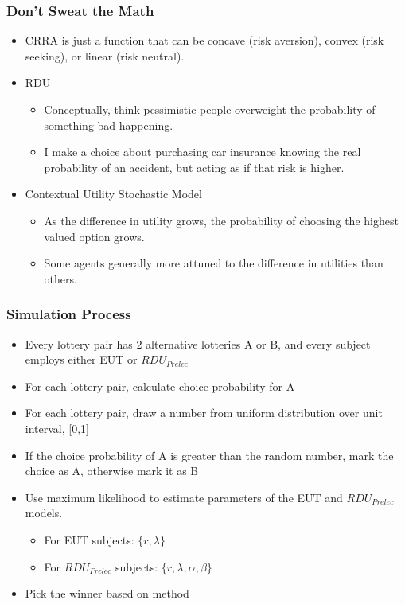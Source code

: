 \documentclass{beamer}
\begin{document}
\begin{frame}
\frametitle{Don't Sweat the Math}
\begin{itemize}
	\item CRRA is just a function that can be concave (risk aversion), convex (risk seeking), or linear (risk neutral).
\end{itemize}
\begin{itemize}
	\item RDU
		\begin{itemize}
			\item Conceptually, think pessimistic people overweight the probability of something bad happening.
			\item I make a choice about purchasing car insurance knowing the real probability of an accident, but acting as if that risk is higher.
		\end{itemize}
\end{itemize}
\begin{itemize}
	\item Contextual Utility Stochastic Model
		\begin{itemize}
			\item As the difference in utility grows, the probability of choosing the highest valued option grows.
			\item Some agents generally more attuned to the difference in utilities than others.
		\end{itemize}
\end{itemize}
\end{frame}

\begin{frame}
\frametitle{Simulation Process}
\begin{itemize}
	\item Every lottery pair has 2 alternative lotteries A or B, and every subject employs either EUT or $\mathit{RDU_{Prelec}}$
	\item For each lottery pair, calculate choice probability for A
	\item For each lottery pair, draw a number from uniform distribution over unit interval, [0,1]
	\item If the choice probability of A is greater than the random number, mark the choice as A, otherwise mark it as B
	\item Use maximum likelihood to estimate parameters of the EUT and $\mathit{RDU_{Prelec}}$ models.
		\begin{itemize}
			\item For EUT subjects: $\lbrace r, \lambda \rbrace$
			\item For $\mathit{RDU_{Prelec}}$ subjects: $\lbrace r, \lambda, \alpha, \beta \rbrace$
		\end{itemize}
	\item Pick the winner based on \textcite{Harrison2016} method
\end{itemize}
\end{frame}
\end{document}
